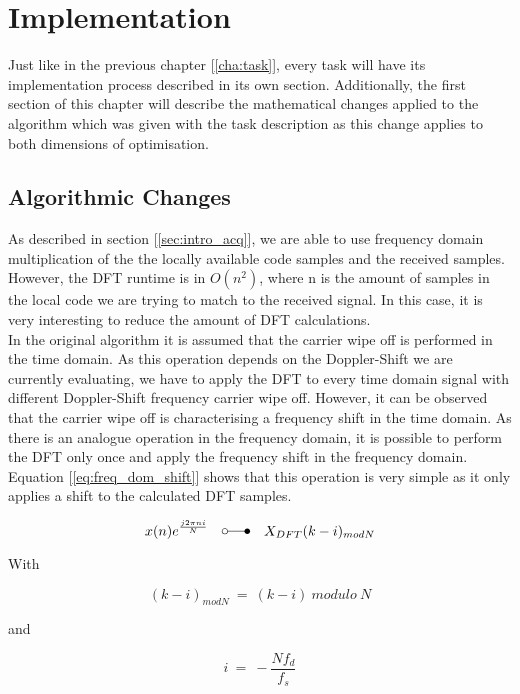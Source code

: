 \chapter{Implementation} %
\label{cha:impl}
	Just like in the previous chapter [\ref{cha:task}], every task will have its implementation process described in its own section.
	Additionally, the first section of this chapter will describe the mathematical changes applied to the algorithm which was given with the task description as this change applies to both dimensions of optimisation. 

	\section{Algorithmic Changes} %
	\label{sec:impl_algorithmic_changes}
		As described in section [\ref{sec:intro_acq}], we are able to use frequency domain multiplication of the the locally available code samples and the received samples. However, the DFT runtime is in $O(n^2)$, where n is the amount of samples in the local code we are trying to match to the received signal. In this case, it is very interesting to reduce the amount of DFT calculations.\\
		In the original algorithm it is assumed that the carrier wipe off is performed in the time domain. As this operation depends on the Doppler-Shift we are currently evaluating, we have to apply the DFT to every time domain signal with different Doppler-Shift frequency carrier wipe off. However, it can be observed that the carrier wipe off is characterising a frequency shift in the time domain. As there is an analogue operation in the frequency domain, it is possible to perform the DFT only once and apply the frequency shift in the frequency domain. Equation [\ref{eq:freq_dom_shift}] shows that this operation is very simple as it only applies a shift to the calculated DFT samples.

		\begin{equation} 
			\label{eq:freq_dom_shift}
			x(n)e^{\frac{j2{\pi}ni}{N}}\quad \laplace\quad X_{DFT}(k-i)_{mod N}
		\end{equation}

		With 

		\begin{equation} 
			(k-i)_{mod N}\ =\ (k-i)\ modulo\ N
		\end{equation}

		and 

		\begin{equation} 
			i\ =\ -\frac{Nf_d}{f_s}
		\end{equation}

